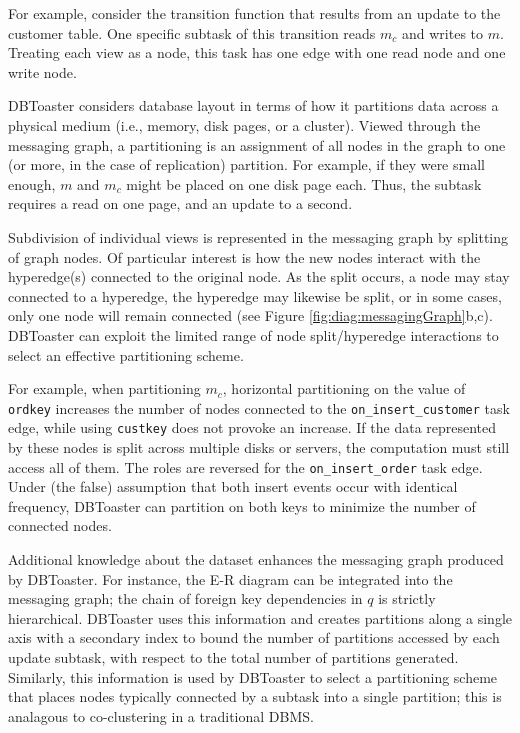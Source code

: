 For example, consider the transition function that results from an update to the customer table.  One specific subtask of this transition reads $m_c$ and writes to $m$.  Treating each view as a node, this task has one edge with one read node and one write node.  

DBToaster considers database layout in terms of how it partitions data across a physical medium (i.e., memory, disk pages, or a cluster).  Viewed through the messaging graph, a partitioning is an assignment of all nodes in the graph to one (or more, in the case of replication) partition.  For example, if they were small enough, $m$ and $m_c$ might be placed on one disk page each.  Thus, the subtask requires a read on one page, and an update to a second.

Subdivision of individual views is represented in the messaging graph by splitting of graph nodes.  Of particular interest is how the new nodes interact with the hyperedge(s) connected to the original node.  As the split occurs, a node may stay connected to a hyperedge, the hyperedge may likewise be split, or in some cases, only one node will remain connected (see Figure \ref{fig:diag:messagingGraph}b,c).  DBToaster can exploit the limited range of node split/hyperedge interactions to select an effective partitioning scheme.

For example, when partitioning $m_c$, horizontal partitioning on the value of \texttt{ordkey} increases the number of nodes connected to the \texttt{on\_insert\_customer} task edge, while using \texttt{custkey} does not provoke an increase.  If the data represented by these nodes is split across multiple disks or servers, the computation must still access all of them.  The roles are reversed for the \texttt{on\_insert\_order} task edge.  Under (the false) assumption that both insert events occur with identical frequency, DBToaster can partition on both keys to minimize the number of connected nodes.

Additional knowledge about the dataset enhances the messaging graph produced by DBToaster.  For instance, the E-R diagram can be integrated into the messaging graph; the chain of foreign key dependencies in $q$ is strictly hierarchical.  DBToaster uses this information and creates partitions along a single axis with a secondary index to bound the number of partitions accessed by each update subtask, with respect to the total number of partitions generated.  Similarly, this information is used by DBToaster to select a partitioning scheme that places nodes typically connected by a subtask into a single partition; this is analagous to co-clustering in a traditional DBMS.
